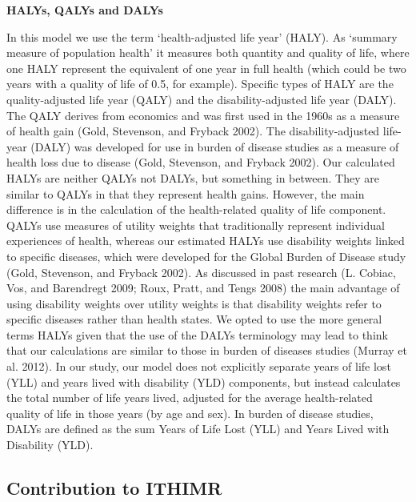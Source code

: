 \documentclass[]{article}
\begin{document}
\textbf{HALYs, QALYs and DALYs}

In this model we use the term `health-adjusted life year' (HALY). As
`summary measure of population health' it measures both quantity and
quality of life, where one HALY represent the equivalent of one year in
full health (which could be two years with a quality of life of 0.5, for
example). Specific types of HALY are the quality-adjusted life year
(QALY) and the disability-adjusted life year (DALY). The QALY derives
from economics and was first used in the 1960s as a measure of health
gain (Gold, Stevenson, and Fryback 2002). The disability-adjusted
life-year (DALY) was developed for use in burden of disease studies as a
measure of health loss due to disease (Gold, Stevenson, and Fryback
2002). Our calculated HALYs are neither QALYs not DALYs, but something
in between. They are similar to QALYs in that they represent health
gains. However, the main difference is in the calculation of the
health-related quality of life component. QALYs use measures of utility
weights that traditionally represent individual experiences of health,
whereas our estimated HALYs use disability weights linked to specific
diseases, which were developed for the Global Burden of Disease study
(Gold, Stevenson, and Fryback 2002). As discussed in past research (L.
Cobiac, Vos, and Barendregt 2009; Roux, Pratt, and Tengs 2008) the main
advantage of using disability weights over utility weights is that
disability weights refer to specific diseases rather than health states.
We opted to use the more general terms HALYs given that the use of the
DALYs terminology may lead to think that our calculations are similar to
those in burden of diseases studies (Murray et al. 2012). In our study,
our model does not explicitly separate years of life lost (YLL) and
years lived with disability (YLD) components, but instead calculates the
total number of life years lived, adjusted for the average
health-related quality of life in those years (by age and sex). In
burden of disease studies, DALYs are defined as the sum Years of Life
Lost (YLL) and Years Lived with Disability (YLD).

\subsection{Contribution to ITHIMR}\label{contribution-to-ithimr}
\end{document}
